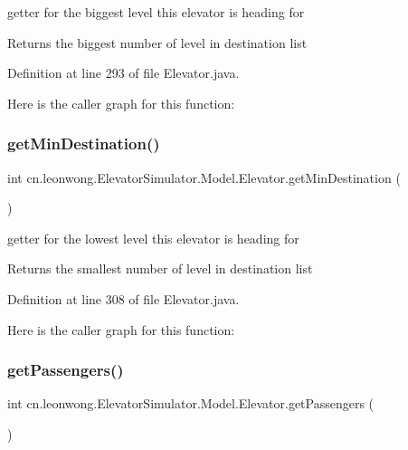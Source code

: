 getter for the biggest level this elevator is heading for \begin{DoxyReturn}{Returns}
the biggest number of level in destination list 
\end{DoxyReturn}


Definition at line 293 of file Elevator.\+java.

Here is the caller graph for this function\+:
\mbox{\label{classcn_1_1leonwong_1_1_elevator_simulator_1_1_model_1_1_elevator_a9aeca7de346d6a46aea0692a60e57681}} 
\subsubsection{\texorpdfstring{get\+Min\+Destination()}{getMinDestination()}}
{\footnotesize\ttfamily int cn.\+leonwong.\+Elevator\+Simulator.\+Model.\+Elevator.\+get\+Min\+Destination (\begin{DoxyParamCaption}{ }\end{DoxyParamCaption})}

getter for the lowest level this elevator is heading for \begin{DoxyReturn}{Returns}
the smallest number of level in destination list 
\end{DoxyReturn}


Definition at line 308 of file Elevator.\+java.

Here is the caller graph for this function\+:
\mbox{\label{classcn_1_1leonwong_1_1_elevator_simulator_1_1_model_1_1_elevator_acd5f3b902008c64175d9b5c035e8d77f}} 
\subsubsection{\texorpdfstring{get\+Passengers()}{getPassengers()}}
{\footnotesize\ttfamily int cn.\+leonwong.\+Elevator\+Simulator.\+Model.\+Elevator.\+get\+Passengers (\begin{DoxyParamCaption}{ }\end{DoxyParamCaption})}

